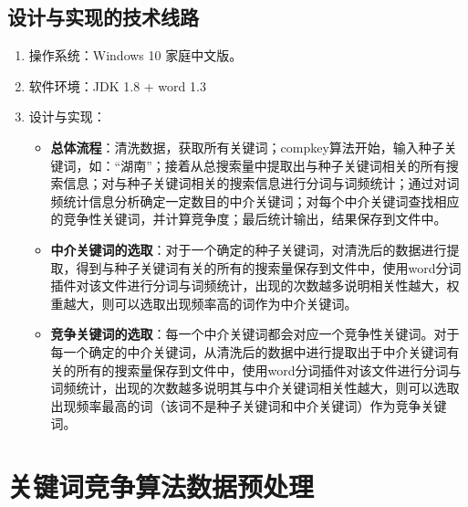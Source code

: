 \documentclass[12pt, a4paper, oneside]{ctexbook}
\begin{document}
\section{设计与实现的技术线路}
\begin{enumerate}
    \item 操作系统：Windows 10 家庭中文版。
    \item 软件环境：JDK 1.8 + word 1.3
    \item 设计与实现：
    \begin{itemize}
        \item \textbf{总体流程}：清洗数据，获取所有关键词；compkey算法开始，输入种子关键词，如：“湖南”；接着从总搜索量中提取出与种子关键词相关的所有搜索信息；对与种子关键词相关的搜索信息进行分词与词频统计；通过对词频统计信息分析确定一定数目的中介关键词；对每个中介关键词查找相应的竞争性关键词，并计算竞争度；最后统计输出，结果保存到文件中。
        \item \textbf{中介关键词的选取}：对于一个确定的种子关键词，对清洗后的数据进行提取，得到与种子关键词有关的所有的搜索量保存到文件中，使用word分词插件对该文件进行分词与词频统计，出现的次数越多说明相关性越大，权重越大，则可以选取出现频率高的词作为中介关键词。
        \item \textbf{竞争关键词的选取}：每一个中介关键词都会对应一个竞争性关键词。对于每一个确定的中介关键词，从清洗后的数据中进行提取出于中介关键词有关的所有的搜索量保存到文件中，使用word分词插件对该文件进行分词与词频统计，出现的次数越多说明其与中介关键词相关性越大，则可以选取出现频率最高的词（该词不是种子关键词和中介关键词）作为竞争关键词。
    \end{itemize}
\end{enumerate}

\chapter{关键词竞争算法数据预处理}
\end{document}
